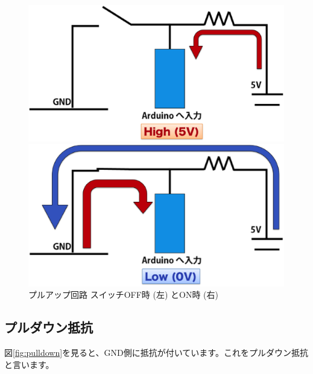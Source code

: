 \documentclass[11pt,a4paper]{jarticle}
\begin{document}
\begin{figure}[htbp]
 \begin{minipage}{0.5\columnwidth}
  \centering
  \includegraphics[width=0.8\columnwidth]{img/pullup_off.eps}
 \end{minipage}
 \begin{minipage}{0.5\columnwidth}
  \includegraphics[width=0.8\columnwidth]{img/pullup_on.eps}
 \end{minipage}
 \caption{プルアップ回路 スイッチOFF時 (左) とON時 (右)  }
 \label{fig:pullup}
\end{figure}


 
\subsection{プルダウン抵抗}
 図\ref{fig:pulldown}を見ると、GND側に抵抗が付いています。これをプルダウン抵抗と言います。
 
\end{document}
